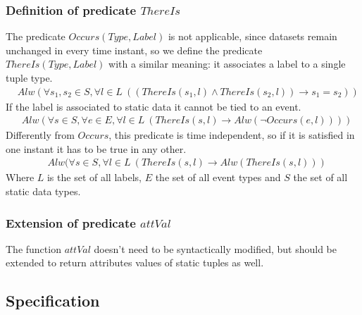 \subsubsection{Definition of predicate $ThereIs$}
The predicate $Occurs(Type, Label)$ is not applicable, since datasets remain unchanged in every time instant, so we define the predicate $ThereIs(Type, Label)$ with a similar meaning: it associates a label to a single tuple type.
\begin{align*}
  &Alw(\forall s_1,s_2 \in S, \forall l \in L\ ((ThereIs(s_1, l) \wedge ThereIs(s_2, l)) \rightarrow s_1=s_2))
\end{align*}
If the label is associated to static data it cannot be tied to an event.
\begin{align*}
  &Alw(\forall s \in S, \forall e \in E, \forall l \in L\ (ThereIs(s, l) \rightarrow Alw(\neg Occurs(e, l))))
\end{align*}
Differently from $Occurs$, this predicate is time independent, so if it is satisfied in one instant it has to be true in any other.
\begin{align*}
  &Alw(\forall s \in S, \forall l \in L\ (ThereIs(s, l) \rightarrow Alw(ThereIs(s, l)))
\end{align*} 
Where $L$ is the set of all labels, $E$ the set of all event types and $S$ the set of all static data types.

\subsubsection{Extension of predicate $attVal$}
The function $attVal$ doesn't need to be syntactically modified, but should be extended to return attributes values of static tuples as well.

\subsection{Specification}

